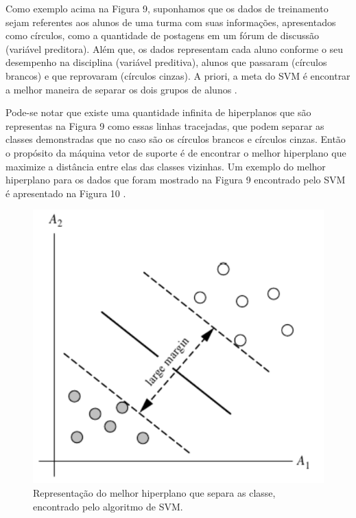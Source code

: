 \par
Como exemplo acima na Figura 9, suponhamos que os dados de treinamento sejam referentes aos alunos de uma turma com suas informações, apresentados como círculos, como a quantidade de postagens em um fórum de discussão (variável preditora). Além que, os dados representam cada aluno conforme o seu desempenho na disciplina (variável preditiva), alunos que passaram (círculos brancos) e que reprovaram (círculos cinzas). A priori, a meta do SVM é encontrar a melhor maneira de separar os dois grupos de alunos \cite{Costa2012}.



\par
Pode-se notar que existe uma quantidade infinita de hiperplanos que são representas na Figura 9 como essas linhas tracejadas, que podem separar as classes demonstradas que no caso são os círculos brancos e círculos cinzas. Então o propósito da máquina vetor de suporte é de encontrar o melhor hiperplano que maximize a distância entre elas das classes vizinhas. Um exemplo do melhor hiperplano para os dados que foram mostrado na Figura 9 encontrado pelo SVM é apresentado na Figura 10 \cite{Costa2012}. 


\begin{figure}[!htp]
	\begin{center}
    \caption{\label{fig:waveform_fig} Representação do melhor hiperplano que separa as classe, encontrado pelo algoritmo de SVM.}
	\includegraphics[scale=0.60]{Figuras/SVM_2.png}
	\end{center}
\end{figure}


